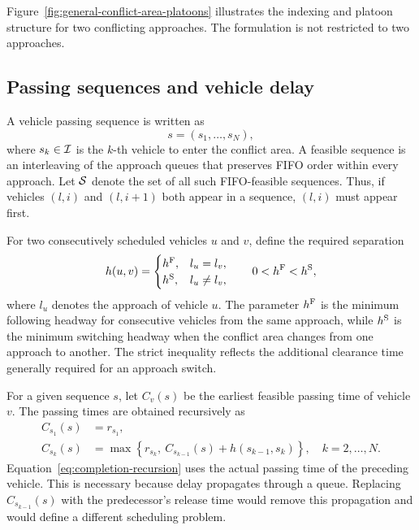 Figure~\ref{fig:general-conflict-area-platoons} illustrates the indexing and platoon structure for two conflicting approaches. The formulation is not restricted to two approaches.

\subsection{Passing sequences and vehicle delay}

A vehicle passing sequence is written as
\begin{equation}
s=(s_1,\ldots,s_N),
\end{equation}
where \(s_k\in\mathcal{I}\) is the \(k\)-th vehicle to enter the conflict area. A feasible sequence is an interleaving of the approach queues that preserves FIFO order within every approach. Let \(\mathcal{S}\) denote the set of all such FIFO-feasible sequences. Thus, if vehicles \((l,i)\) and \((l,i+1)\) both appear in a sequence, \((l,i)\) must appear first.

For two consecutively scheduled vehicles \(u\) and \(v\), define the required separation
\begin{equation}
h(u,v)=
\begin{cases}
h^{\mathrm{F}}, & l_u=l_v,\\
h^{\mathrm{S}}, & l_u\ne l_v,
\end{cases}
\qquad 0<h^{\mathrm{F}}<h^{\mathrm{S}},
\label{eq:headway-definition}
\end{equation}
where \(l_u\) denotes the approach of vehicle \(u\). The parameter \(h^{\mathrm{F}}\) is the minimum following headway for consecutive vehicles from the same approach, while \(h^{\mathrm{S}}\) is the minimum switching headway when the conflict area changes from one approach to another. The strict inequality reflects the additional clearance time generally required for an approach switch.

For a given sequence \(s\), let \(C_v(s)\) be the earliest feasible passing time of vehicle \(v\). The passing times are obtained recursively as
\begin{align}
C_{s_1}(s)&=r_{s_1},
\label{eq:first-completion}\\
C_{s_k}(s)&=\max\left\{r_{s_k},\ C_{s_{k-1}}(s)+h(s_{k-1},s_k)\right\},
\quad k=2,\ldots,N.
\label{eq:completion-recursion}
\end{align}
Equation~\eqref{eq:completion-recursion} uses the actual passing time of the preceding vehicle. This is necessary because delay propagates through a queue. Replacing \(C_{s_{k-1}}(s)\) with the predecessor's release time would remove this propagation and would define a different scheduling problem.

